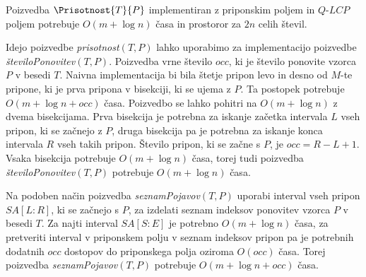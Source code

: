 \begin{izr}\label{izr:LCP}
    Poizvedba $\Prisotnost{T}{P}$ implementiran z priponskim poljem in $\textit{Q-LCP}$ poljem potrebuje $O(m+\log{n})$ časa in prostoror za $2n$ celih števil.
\end{izr}





Idejo poizvedbe \textit{prisotnost}$(T,P)$ lahko uporabimo za implementacijo poizvedbe \textit{številoPonovitev}$(T,P)$. Poizvedba vrne število $occ$, ki je število ponovite vzorca $P$ v besedi $T$. Naivna implementacija bi bila štetje pripon levo in desno od $M$-te pripone, ki je prva pripona v bisekciji, ki se ujema z $P$. Ta postopek potrebuje $O(m + \log{n}+occ)$ časa. Poizvedbo se lahko pohitri na $O(m + \log{n})$ z dvema bisekcijama. Prva bisekcija je potrebna za iskanje začetka intervala $L$ vseh pripon, ki se začnejo z $P$, druga bisekcija pa je potrebna za iskanje konca intervala $R$ vseh takih pripon. Število pripon, ki se začne s $P$, je $occ=R-L+1$. Vsaka bisekcija potrebuje $O(m+\log{n})$ časa, torej tudi poizvedba \textit{številoPonovitev}$(T,P)$ potrebuje $O(m+\log{n})$ časa.

Na podoben način poizvedba \textit{seznamPojavov}$(T,P)$ uporabi interval vseh pripon $SA[L:R]$, ki se začnejo s $P$, za izdelati seznam indeksov ponovitev vzorca $P$ v besedi $T$. Za najti interval $SA[S:E]$ je potrebno $O(m+\log{n})$ časa, za pretveriti interval v priponskem polju v seznam indeksov pripon pa je potrebnih dodatnih $occ$ dostopov do priponskega polja oziroma $O(occ)$ časa. Torej poizvedba \textit{seznamPojavov}$(T,P)$ potrebuje $O(m+\log{n}+occ)$ časa.


